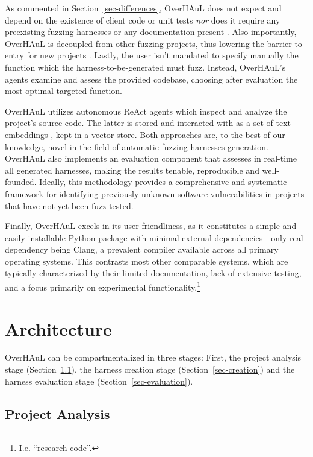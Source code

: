 \documentclass[
  a4paper,
]{scrreprt}
\theoremstyle{definition}
\theoremstyle{remark}
\begin{document}
As commented in Section~\ref{sec-differences}, OverHAuL does not expect
and depend on the existence of client code or unit tests
\autocite{utopia,fudge,fuzzgen} \emph{nor} does it require any
preexisting fuzzing harnesses \autocite{oss-fuzz-gen} or any
documentation present \autocite{sun2024}. Also importantly, OverHAuL is
decoupled from other fuzzing projects, thus lowering the barrier to
entry for new projects \autocite{oss-fuzz-gen,oss-fuzz}. Lastly, the
user isn't mandated to specify manually the function which the
harness-to-be-generated must fuzz. Instead, OverHAuL's agents examine
and assess the provided codebase, choosing after evaluation the most
optimal targeted function.

OverHAuL utilizes autonomous ReAct agents \autocite{reAct} which inspect
and analyze the project's source code. The latter is stored and
interacted with as a set of text embeddings \autocite{mikolov2013}, kept
in a vector store. Both approaches are, to the best of our knowledge,
novel in the field of automatic fuzzing harnesses generation. OverHAuL
also implements an evaluation component that assesses in real-time all
generated harnesses, making the results tenable, reproducible and
well-founded. Ideally, this methodology provides a comprehensive and
systematic framework for identifying previously unknown software
vulnerabilities in projects that have not yet been fuzz tested.

Finally, OverHAuL excels in its user-friendliness, as it constitutes a
simple and easily-installable Python package with minimal external
dependencies---only real dependency being Clang, a prevalent compiler
available across all primary operating systems. This contrasts most
other comparable systems, which are typically characterized by their
limited documentation, lack of extensive testing, and a focus primarily
on experimental functionality.\footnote{I.e. ``research code''.}

\section{Architecture}\label{sec-architecture}

OverHAuL can be compartmentalized in three stages: First, the project
analysis stage (Section~\ref{sec-analysis}), the harness creation stage
(Section~\ref{sec-creation}) and the harness evaluation stage
(Section~\ref{sec-evaluation}).

\subsection{Project Analysis}\label{sec-analysis}
\end{document}
